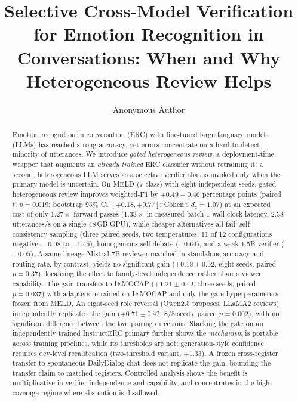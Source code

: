 \documentclass[final,5p,times,twocolumn]{elsarticle}
\begin{document}
\begin{frontmatter}

\title{Selective Cross-Model Verification for Emotion Recognition
in Conversations: When and Why Heterogeneous Review Helps}

\author[1]{Anonymous Author}

\begin{abstract}
Emotion recognition in conversation (ERC) with fine-tuned large language
models (LLMs) has reached strong accuracy, yet errors concentrate on a
hard-to-detect minority of utterances. We introduce \emph{gated
heterogeneous review}, a deployment-time wrapper that augments an
\emph{already trained} ERC classifier without retraining it: a second,
heterogeneous LLM serves as a selective verifier that is invoked
only when the primary model is uncertain. On MELD (7-class) with eight
independent seeds, gated heterogeneous review improves weighted-F1 by
$+0.49 \pm 0.46$ percentage points (paired $t$: $p=0.019$; bootstrap 95\%
CI $[+0.18, +0.77]$; Cohen's $d_z=1.07$) at an expected cost of only
$1.27\times$ forward passes ($1.33\times$ in measured batch-1 wall-clock
latency, 2.38 utterances/s on a single 48\,GB GPU), while cheaper
alternatives all fail:
self-consistency
sampling (three paired seeds, two temperatures; 11 of 12 configurations
negative, $-0.08$ to $-1.45$), homogeneous self-debate
($-0.64$), and a weak 1.5B verifier ($-0.05$). A same-lineage Mistral-7B reviewer matched in standalone
accuracy and routing rate, by contrast, yields no significant gain
($+0.18 \pm 0.52$, eight seeds, paired $p{=}0.37$), localising the effect
to family-level independence rather than reviewer capability. The gain
transfers to IEMOCAP ($+1.21 \pm 0.42$,
three seeds, paired $p{=}0.037$) with adapters retrained on IEMOCAP and
only the gate hyperparameters frozen from MELD.
An eight-seed role reversal (Qwen2.5 proposes, LLaMA2 reviews) independently
replicates the gain ($+0.71 \pm 0.42$, 8/8 seeds, paired $p{=}0.002$), with
no significant difference between the two pairing directions.
Stacking the gate on an independently trained InstructERC primary further
shows the \emph{mechanism} is portable across training pipelines, while its
thresholds are not: generation-style confidence requires dev-level
recalibration (two-threshold variant, $+1.33$). A frozen cross-register
transfer to spontaneous DailyDialog chat
does not replicate the gain, bounding the transfer claim to matched
registers. Controlled analysis shows the benefit
is multiplicative in verifier independence and capability, and concentrates
in the high-coverage regime where abstention is disallowed.
\end{abstract}


\end{frontmatter}
\end{document}
